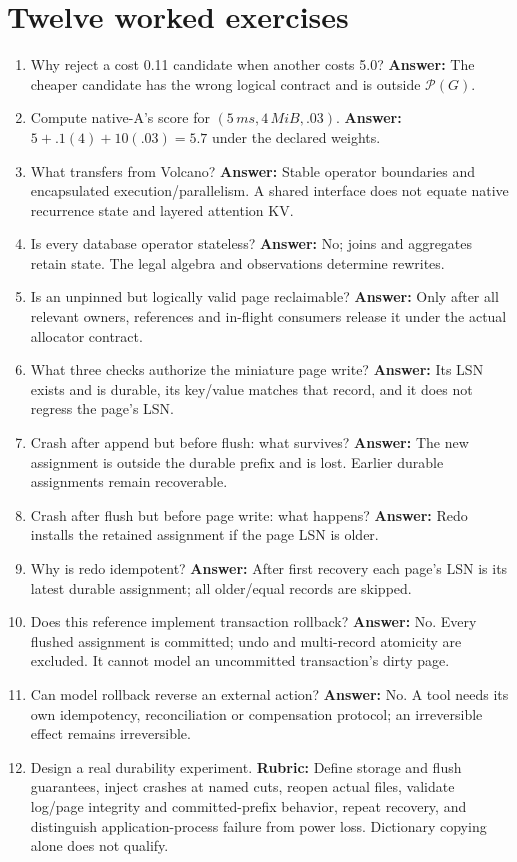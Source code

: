 \section{Twelve worked exercises}
\label{evod42:exercises}
\begin{enumerate}
\item Why reject a cost 0.11 candidate when another costs 5.0?
\textbf{Answer:} The cheaper candidate has the wrong logical contract and is
outside $\mathcal P(G)$.
\item Compute native-A's score for $(5\,ms,4\,MiB,.03)$.
\textbf{Answer:} $5+.1(4)+10(.03)=5.7$ under the declared weights.
\item What transfers from Volcano? \textbf{Answer:} Stable operator boundaries
and encapsulated execution/parallelism. A shared interface does not equate
native recurrence state and layered attention KV.
\item Is every database operator stateless? \textbf{Answer:} No; joins and
aggregates retain state. The legal algebra and observations determine rewrites.
\item Is an unpinned but logically valid page reclaimable?
\textbf{Answer:} Only after all relevant owners, references and in-flight
consumers release it under the actual allocator contract.
\item What three checks authorize the miniature page write?
\textbf{Answer:} Its LSN exists and is durable, its key/value matches that
record, and it does not regress the page's LSN.
\item Crash after append but before flush: what survives?
\textbf{Answer:} The new assignment is outside the durable prefix and is lost.
Earlier durable assignments remain recoverable.
\item Crash after flush but before page write: what happens?
\textbf{Answer:} Redo installs the retained assignment if the page LSN is older.
\item Why is redo idempotent? \textbf{Answer:} After first recovery each
page's LSN is its latest durable assignment; all older/equal records are skipped.
\item Does this reference implement transaction rollback?
\textbf{Answer:} No. Every flushed assignment is committed; undo and multi-record
atomicity are excluded. It cannot model an uncommitted transaction's dirty page.
\item Can model rollback reverse an external action?
\textbf{Answer:} No. A tool needs its own idempotency, reconciliation or
compensation protocol; an irreversible effect remains irreversible.
\item Design a real durability experiment. \textbf{Rubric:} Define storage
and flush guarantees, inject crashes at named cuts, reopen actual files,
validate log/page integrity and committed-prefix behavior, repeat recovery,
and distinguish application-process failure from power loss. Dictionary copying
alone does not qualify.
\end{enumerate}

